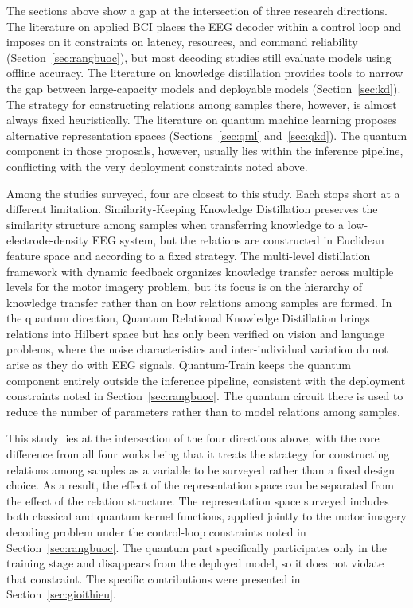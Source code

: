 The sections above show a gap at the intersection of three research
directions. The literature on applied BCI places the EEG decoder
within a control loop and imposes on it constraints on latency,
resources, and command reliability (Section~\ref{sec:rangbuoc}), but
most decoding studies still evaluate models using offline accuracy.
The literature on knowledge distillation provides tools to narrow the
gap between large-capacity models and deployable models
(Section~\ref{sec:kd}). The strategy for constructing relations among
samples there, however, is almost always fixed heuristically. The
literature on quantum machine learning proposes alternative
representation spaces (Sections~\ref{sec:qml} and~\ref{sec:qkd}). The
quantum component in those proposals, however, usually lies within
the inference pipeline, conflicting with the very deployment
constraints noted above.

Among the studies surveyed, four are closest to this study. Each
stops short at a different limitation. Similarity-Keeping Knowledge
Distillation \cite{huang2024enhancing} preserves the similarity
structure among samples when transferring knowledge to a
low-electrode-density EEG system, but the relations are constructed
in Euclidean feature space and according to a fixed strategy. The
multi-level distillation framework with dynamic feedback
\cite{wu2026multilevel} organizes knowledge transfer across multiple
levels for the motor imagery problem, but its focus is on the
hierarchy of knowledge transfer rather than on how relations among
samples are formed. In the quantum direction, Quantum Relational
Knowledge Distillation \cite{liu2025quantum} brings relations into
Hilbert space but has only been verified on vision and language
problems, where the noise characteristics and inter-individual
variation do not arise as they do with EEG signals. Quantum-Train
\cite{liu2025quantumtrain} keeps the quantum component entirely
outside the inference pipeline, consistent with the deployment
constraints noted in Section~\ref{sec:rangbuoc}. The quantum circuit
there is used to reduce the number of parameters rather than to model
relations among samples.

This study lies at the intersection of the four directions above,
with the core difference from all four works being that it treats
the strategy for constructing relations among samples as a variable
to be surveyed rather than a fixed design choice. As a result, the
effect of the representation space can be separated from the effect
of the relation structure. The representation space surveyed includes
both classical and quantum kernel functions, applied jointly to the
motor imagery decoding problem under the control-loop constraints
noted in Section~\ref{sec:rangbuoc}. The quantum part specifically
participates only in the training stage and disappears from the
deployed model, so it does not violate that constraint. The specific
contributions were presented in Section~\ref{sec:gioithieu}.


